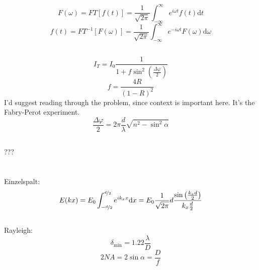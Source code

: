 \documentclass[12pt]{report}
\newcommand{\vphi}{\varphi}
\newcommand{\dd}{\mathrm{d}}
\begin{document}
\subsection{}
\[F(\omega)=FT[f(t)]=\frac{1}{\sqrt{2\pi}}\int_{-\infty}^\infty e^{i\omega t}f(t)\dd t\]
\[f(t)=FT^{-1}[F(\omega)]=\frac{1}{\sqrt{2\pi}}\int_{-\infty}^\infty e^{-i\omega t}F(\omega)\dd\omega\]

\subsection{}

\[I_T=I_0\frac{1}{1+f\sin^2\left(\frac{\Delta\vphi}{2}\right)}\]
\[f=\frac{4R}{(1-R)^2}\]
I'd suggest reading through the problem, since context is important here. It's the Fabry-Perot experiment.
\[\frac{\Delta\vphi}{2}=2\pi\frac{d}{\lambda}\sqrt{n^2-\sin^2\alpha}\]

\subsection{}
???

\section{}

\subsection{}

Einzelspalt:
\[E(kx)=E_0\int_{-\nicefrac{d}{2}}^{\nicefrac{d}{2}}e^{ik_xx}\dd x=E_0\frac{1}{\sqrt{2\pi}}d\frac{\sin\left(\frac{k_xd}{2}\right)}{k_x\frac{d}{2}}\]

\subsection{}

\subsection{}

Rayleigh:
\[\delta_\mathrm{min}=1.22\frac{\lambda}{D}\]
\[2NA=2\sin\alpha=\frac{D}{f}\]

\subsection{}

\section{}
\end{document}
